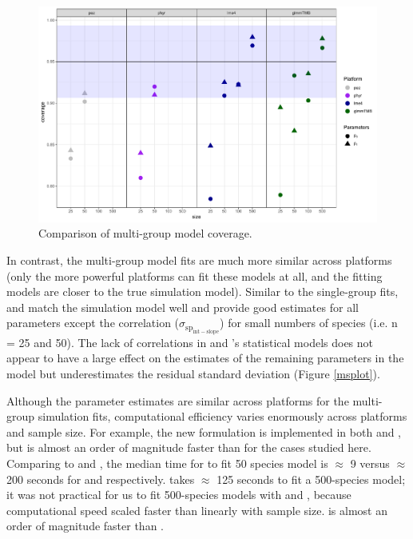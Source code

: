 \documentclass[12pt]{article}
\begin{document}
\begin{center}
\begin{figure}[H]
  \includegraphics[scale=0.8]{./figure/mscoverage.pdf}
  \caption{Comparison of multi-group model coverage.}
  \label{msplot_coverage}
\end{figure}
\end{center}


In contrast, the multi-group model fits are much more similar across platforms (only the more powerful platforms can fit these models at all, and the fitting models are closer to the true simulation model).
Similar to the single-group fits,  and  match the simulation model well and provide good estimates for all parameters except the correlation ($\sigma_{\mathrm{sp_{int-slope}}}$) for small numbers of species (i.e. n = 25 and 50).
The lack of correlations in  and 's statistical models does not appear to have a large effect on the estimates of the remaining parameters in the model but underestimates the residual standard deviation (Figure \ref{msplot}).

Although the parameter estimates are similar across platforms for the multi-group simulation fits, computational efficiency varies enormously across platforms and sample size.
For example, the new formulation is implemented in both  and , but  is almost an order of magnitude faster than  for the cases studied here.
Comparing  to  and , the median time for  to fit 50 species model is $\approx$ 9 versus $\approx$ 200 seconds for  and  respectively. 
 takes $\approx$ 125 seconds to fit a 500-species model; it was not practical for us to fit 500-species models with  and , because computational speed scaled faster than linearly with sample size.
 is almost an order of magnitude faster than .
\end{document}
